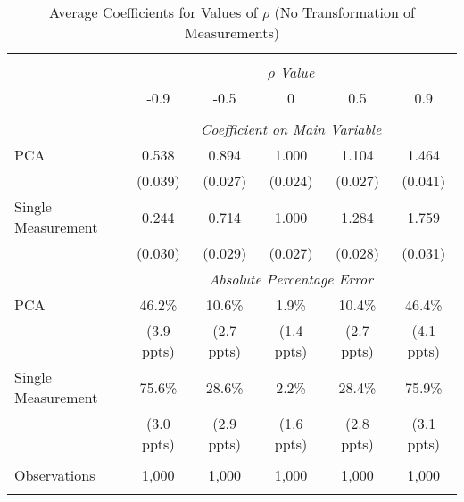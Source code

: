\begin{table}[!htbp] \centering
  \caption{Average Coefficients for Values of $\rho$ (No Transformation of Measurements) \label{sim_rho_2_noexp}}
\begin{tabular}{@{\extracolsep{5pt}}lccccc}
\\[-1.8ex]\hline
\hline \\[-1.8ex]
& \multicolumn{5}{c}{$\rho$ \textit{ Value}} \
\cr \
\\[-1.8ex] & -0.9 & -0.5 & 0 & 0.5 & 0.9 \\
\hline \\[-1.8ex]
& \multicolumn{5}{c}{\textit{Coefficient on Main Variable}} \\
 PCA & 0.538 & 0.894 & 1.000 & 1.104 & 1.464  \\
  & (0.039) & (0.027) & (0.024) & (0.027) & (0.041)\\
  Single Measurement & 0.244 & 0.714 & 1.000 & 1.284 & 1.759  \\
  & (0.030) & (0.029) & (0.027) & (0.028) & (0.031)\\
& \multicolumn{5}{c}{\textit{Absolute Percentage Error}} \\
  PCA & 46.2\% & 10.6\% & 1.9\% & 10.4\% & 46.4\% \\
   & (3.9 ppts) & (2.7 ppts) & (1.4 ppts) & (2.7 ppts) & (4.1 ppts)\\
  Single Measurement & 75.6\% & 28.6\% & 2.2\% & 28.4\% & 75.9\%  \\
  & (3.0 ppts) & (2.9 ppts) & (1.6 ppts) & (2.8 ppts) & (3.1 ppts)\\
\hline \\[-1.8ex]
 Observations & 1,000 & 1,000 & 1,000 & 1,000 & 1,000\\
\hline
\hline \\[-1.8ex]
\end{tabular}
\end{table}
